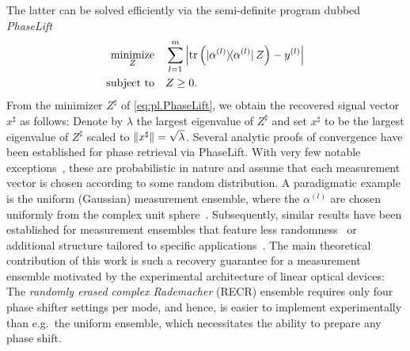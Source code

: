 


The latter can be solved efficiently via the semi-definite program dubbed \emph{PhaseLift}~\cite{Candes_2013_Phaselift}
\begin{align}
  \underset{{Z}}{\textrm{minimize}} & \quad \sum_{l=1}^m \left| \tr \left( \ket{\alpha^{(l)}} \bra{\alpha^{(l)}} \, {Z} \right) - y^{(l)} \right| \label{eq:pl.PhaseLift} \\
  \textrm{subject to} &\quad  {Z} \geq 0. \nonumber
\end{align}
From the minimizer ${ Z}^\sharp$ of \cref{eq:pl.PhaseLift}, we obtain the recovered signal vector ${ x}^\sharp$ as follows:
Denote by $\lambda$ the largest eigenvalue of ${ Z}^\sharp$ and set ${ x}^\sharp$ to be the largest eigenvalue of ${ Z}^\sharp$ scaled to ${\Vert{ x}^\sharp\Vert} = \sqrt\lambda$.
Several analytic proofs of convergence have been established for phase retrieval via PhaseLift.
With very few notable exceptions~\cite{Kech_2016_Explicit}, these are probabilistic in nature and assume that each measurement vector is chosen according to some random distribution.
A paradigmatic example is the uniform (Gaussian) measurement ensemble, where the $\alpha^{(l)}$ are chosen uniformly from the complex unit sphere~\cite{Candes_2013_Phaselift}.
Subsequently, similar results have been established for measurement ensembles that feature less randomness~\cite{Gross_2014_Partial,Kueng_2014_Low,Kueng_2014_Low,Kueng_2016_Low} or additional structure tailored to specific applications~\cite{Candes_2013_Phaselift,Gross_2017_Improved,Voroninski_2013_Quantum,Kueng_2015_Low}.
The main theoretical contribution of this work is such a recovery guarantee for a measurement ensemble motivated by the experimental architecture of linear optical devices:
The \emph{randomly erased complex Rademacher} (RECR) ensemble requires only four phase shifter settings per mode, and hence, is easier to implement experimentally than e.g.\ the uniform ensemble, which necessitates the ability to prepare any phase shift.



